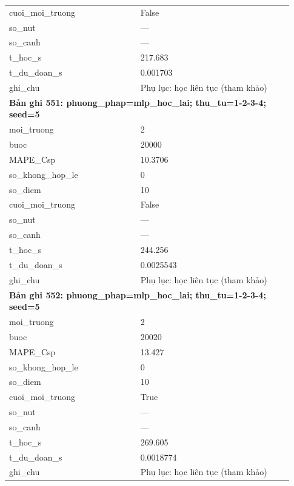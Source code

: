 \begin{longtable}{p{0.43\linewidth}p{0.50\linewidth}}
cuoi\_\allowbreak moi\_\allowbreak truong & False \\
so\_\allowbreak nut & — \\
so\_\allowbreak canh & — \\
t\_\allowbreak hoc\_\allowbreak s & 217.683 \\
t\_\allowbreak du\_\allowbreak doan\_\allowbreak s & 0.001703 \\
ghi\_\allowbreak chu & Phụ lục: học liên tục (tham khảo) \\
\midrule
\multicolumn{2}{p{0.95\linewidth}}{\textbf{Bản ghi 551: phuong\_phap=mlp\_hoc\_lai; thu\_tu=1-2-3-4; seed=5}} \\
moi\_\allowbreak truong & 2 \\
buoc & 20000 \\
MAPE\_\allowbreak Csp & 10.3706 \\
so\_\allowbreak khong\_\allowbreak hop\_\allowbreak le & 0 \\
so\_\allowbreak diem & 10 \\
cuoi\_\allowbreak moi\_\allowbreak truong & False \\
so\_\allowbreak nut & — \\
so\_\allowbreak canh & — \\
t\_\allowbreak hoc\_\allowbreak s & 244.256 \\
t\_\allowbreak du\_\allowbreak doan\_\allowbreak s & 0.0025543 \\
ghi\_\allowbreak chu & Phụ lục: học liên tục (tham khảo) \\
\midrule
\multicolumn{2}{p{0.95\linewidth}}{\textbf{Bản ghi 552: phuong\_phap=mlp\_hoc\_lai; thu\_tu=1-2-3-4; seed=5}} \\
moi\_\allowbreak truong & 2 \\
buoc & 20020 \\
MAPE\_\allowbreak Csp & 13.427 \\
so\_\allowbreak khong\_\allowbreak hop\_\allowbreak le & 0 \\
so\_\allowbreak diem & 10 \\
cuoi\_\allowbreak moi\_\allowbreak truong & True \\
so\_\allowbreak nut & — \\
so\_\allowbreak canh & — \\
t\_\allowbreak hoc\_\allowbreak s & 269.605 \\
t\_\allowbreak du\_\allowbreak doan\_\allowbreak s & 0.0018774 \\
ghi\_\allowbreak chu & Phụ lục: học liên tục (tham khảo) \\

\end{longtable}
